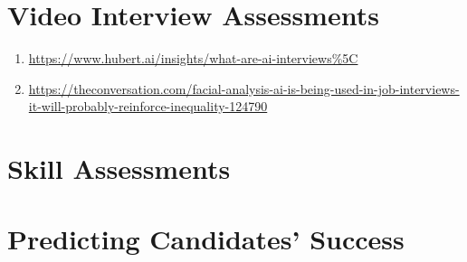 \documentclass[
]{book}
\begin{document}
\hypertarget{video-interview-assessments-1}{%
\section{Video Interview Assessments}\label{video-interview-assessments-1}}

\begin{enumerate}
\def\labelenumi{(\arabic{enumi})}
\item
  \url{https://www.hubert.ai/insights/what-are-ai-interviews\%5C}
\item
  \url{https://theconversation.com/facial-analysis-ai-is-being-used-in-job-interviews-it-will-probably-reinforce-inequality-124790}
\end{enumerate}

\hypertarget{skill-assessments-1}{%
\section{Skill Assessments}\label{skill-assessments-1}}

\hypertarget{predicting-candidates-success-1}{%
\section{Predicting Candidates' Success}\label{predicting-candidates-success-1}}

  
\end{document}
